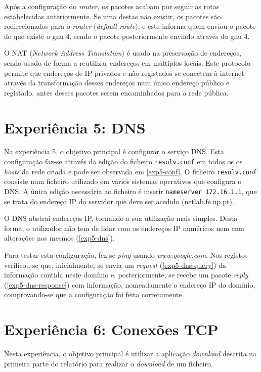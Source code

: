 \documentclass[article, a4paper, 11pt, oneside]{memoir}
\begin{document}
Após a configuração do \textit{router}, os pacotes acabam por seguir as rotas estabelecidas
anteriormente. Se uma destas não existir, os pacotes são redirecionados para o \textit{router}
(\textit{default route}), e este informa quem enviou o pacote de que existe o gnu 4, sendo o pacote
posteriormente enviado através do gnu 4.

O NAT (\textit{Network Address Translation}) é usado na preservação de endereços,
sendo usado de forma a reutilizar endereços em múltiplos locais.
Este protocolo permite que endereços de IP privados e não registados se conectem à internet
através da transformação desses endereços num único endereço público e registado,
antes desses pacotes serem encaminhados para a rede pública.

\section{\textbf{Experiência 5}: DNS}

Na experiência 5, o objetivo principal é configurar o serviço DNS. Esta configuração faz-se 
através da edição do ficheiro \verb|resolv.conf| em todos os os \textit{hosts} da rede criada 
e pode ser observada em \ref{exp5-conf}.
O ficheiro \verb|resolv.conf| consiste num ficheiro utilizado em vários sistemas operativos
que configura o DNS. A única edição necessária ao ficheiro é inserir \verb|nameserver 172.16.1.1|,
que se trata do endereço IP do servidor que deve ser acedido (netlab.fe.up.pt).

O DNS abstrai endereços IP, tornando a sua utilização mais simples. Desta forma, o utilizador
não tem de lidar com os endereços IP numéricos nem com alterações nos mesmos (\ref{exp5-dns}).

Para testar esta configuração, fez-se \textit{ping} usando \textit{www.google.com}. Nos registos
verificou-se que, inicialmente, se envia um \textit{request} (\ref{exp5-dns-query}) da
informação contida neste domínio e, posteriormente, se recebe um pacote \textit{reply}
(\ref{exp5-dns-response}) com informação, nomeadamente o endereço IP do domínio,
comprovando-se que a configuração foi feita corretamente.

\section{\textbf{Experiência 6}: Conexões TCP}

Nesta experiência, o objetivo principal é utilizar a aplicação \textit{download} descrita na 
primeira parte do relatório para realizar o \textit{download} de um ficheiro.
\end{document}
